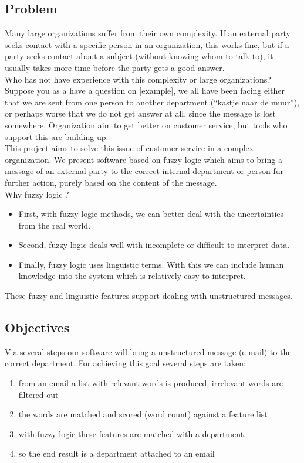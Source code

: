 \documentclass[a4paper]{article}
\begin{document}
\subsection{Problem}
Many large organizations suffer from their own complexity. If an external party seeks contact with a specific person in an organization, this works fine, but if a party seeks contact about a subject (without knowing whom to talk to), it usually takes more time before the party gets a good answer. \\

Who has not have experience with this complexity or large organizations? Suppose you as a have a question on [example], we all have been facing either that we are sent from one person to another department (“kastje naar de muur”), or perhaps worse that we do not get answer at all, since the message is lost somewhere. Organization aim to get better on customer service, but tools who support this are building up. \\

This project aims to solve this issue of customer service in a complex organization. We present software based on fuzzy logic which aims to bring a message of an external party to the correct internal department or person fur further action, purely based on the content of the message. \\

Why fuzzy logic ?
\begin{itemize}
    \item First, with fuzzy logic methods, we can better deal with the uncertainties from the real world.
    \item Second, fuzzy logic deals well with incomplete or difficult to interpret data.
    \item Finally, fuzzy logic uses linguistic terms. With this we can include human knowledge into the system which is relatively easy to interpret.
\end{itemize}
These fuzzy and linguistic features support dealing with unstructured messages.

\subsection{Objectives}

Via several steps our software will bring a unstructured message (e-mail) to the correct department. For achieving this goal several steps are taken:
\begin{enumerate}
    \item from an email a list with relevant words is produced, irrelevant words are filtered out
    \item the words are matched and scored (word count) against a feature list
    \item with fuzzy logic these features are matched with a department.
    \item so the end result is a department attached to an email
\end{enumerate}
\end{document}
